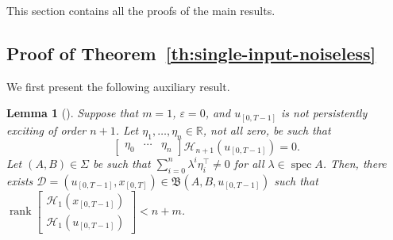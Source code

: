 \documentclass[journal,twoside,web]{ieeecolor}
\DeclareMathOperator{\rank}{rank}
\DeclareMathOperator{\spec}{spec}
\newtheorem{lemma}[theorem]{Lemma}
\begin{document}
\renewcommand{\thesubsection}{\Alph{subsection}}




This section contains all the proofs of the main results. 





\subsection{Proof of Theorem~\ref{th:single-input-noiseless}}

We first present the following auxiliary result. 

\begin{lemma}[{\cite[prop. 3]{shakouri2025new}}]
\label{lem:contruction_m=1}
Suppose that $m=1$, $\varepsilon=0$, and $u_{[0,T-1]}$ is not persistently exciting of order $n+1$. Let $\eta_1,\ldots,\eta_n\in\mathbb{R}$, not all zero, be such that
\begin{equation}
\label{eq:eta_ker_m=1}
\begin{bmatrix}
\eta_0 & \cdots & \eta_n
\end{bmatrix}\mathcal{H}_{n+1}(u_{[0,T-1]})=0.
\end{equation}
Let $(A,B)\in\Sigma$ be such that $\sum_{i=0}^n \lambda^i \eta_i^\top\neq 0$ for all \mbox{$\lambda\in\spec A$}. Then, there exists $\mathcal{D}=(u_{[0,T-1]},x_{[0,T]})\in\mathfrak{B}(A,B,u_{[0,T-1]})$ such that $\rank \begin{bmatrix}
\mathcal{H}_1(x_{[0,T-1]}) \\ \mathcal{H}_1(u_{[0,T-1]})
\end{bmatrix}<n+m$. 
\end{lemma}\vspace{0.2 cm}
\end{document}
